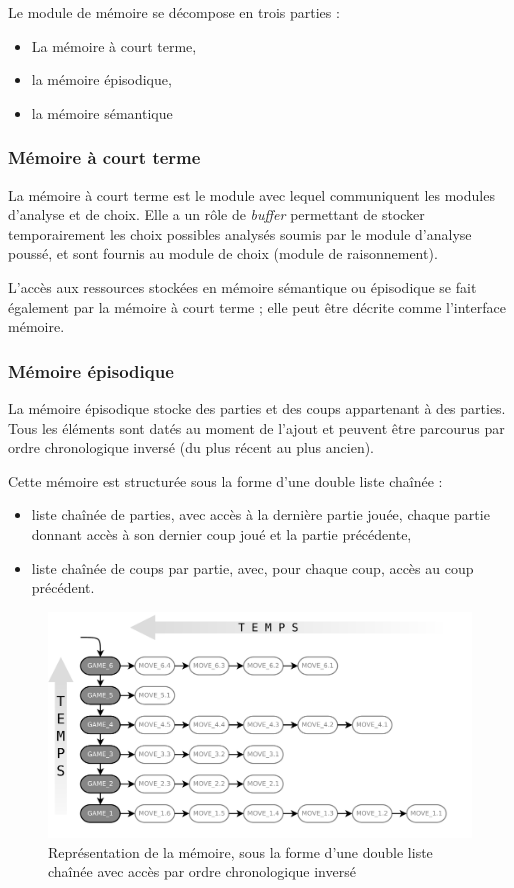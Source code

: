 Le module de mémoire se décompose en trois parties :
\begin{itemize}
\item La mémoire à court terme,
\item la mémoire épisodique,
\item la mémoire sémantique
\end{itemize}

\subsubsection{Mémoire à court terme}

La mémoire à court terme est le module avec lequel communiquent les modules d'analyse et de choix. Elle a un rôle de \emph{buffer} permettant de stocker temporairement les choix possibles analysés soumis par le module d'analyse poussé, et sont fournis au module de choix (module de raisonnement).

L'accès aux ressources stockées en mémoire sémantique ou épisodique se fait également par la mémoire à court terme ; elle peut être décrite comme l'interface mémoire.

\subsubsection{Mémoire épisodique}

La mémoire épisodique stocke des parties et des coups appartenant à des parties. Tous les éléments sont datés au moment de l'ajout et peuvent être parcourus par ordre chronologique inversé (du plus récent au plus ancien).

Cette mémoire est structurée sous la forme d'une double liste chaînée :
\begin{itemize}
\item liste chaînée de parties, avec accès à la dernière partie jouée, chaque partie donnant accès à son dernier coup joué et la partie précédente,
\item liste chaînée de coups par partie, avec, pour chaque coup, accès au coup précédent.
\end{itemize}

\begin{figure}[h]
\includegraphics[width=\textwidth]{files/memoire/episodic_general}
\caption{Représentation de la mémoire, sous la forme d'une double liste chaînée avec accès par ordre chronologique inversé}
\end{figure}

